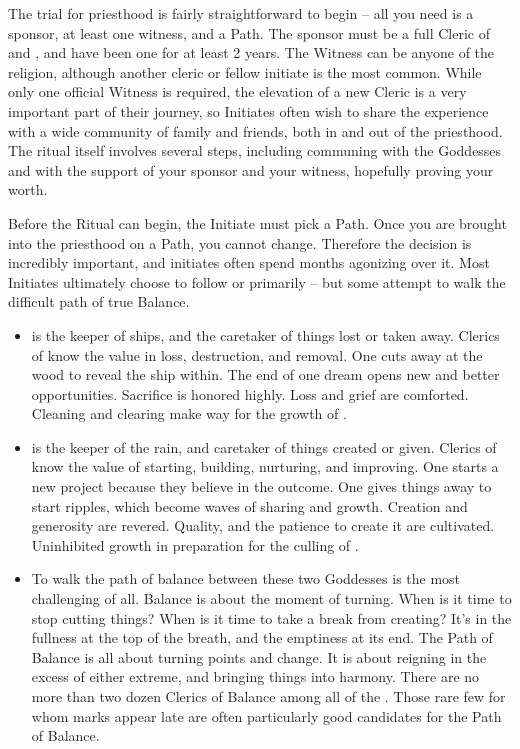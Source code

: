 \documentclass[blue]{GL2020}
\begin{document}
The trial for priesthood is fairly straightforward to begin -- all you need is a sponsor, at least one witness, and a Path. The sponsor must be a full Cleric of \cEbb{} and \cFlow{}, and have been one for at least 2 years. The Witness can be anyone of the \pShippie{} religion, although another cleric or fellow initiate is the most common. While only one official Witness is required, the elevation of a new Cleric is a very important part of their journey, so Initiates often wish to share the experience with a wide community of family and friends, both in and out of the priesthood. The ritual itself involves several steps, including communing with the Goddesses and with the support of your sponsor and your witness, hopefully proving your worth.

Before the Ritual can begin, the Initiate must pick a Path. Once you are brought into the priesthood on a Path, you cannot change. Therefore the decision is incredibly important, and initiates often spend months agonizing over it. Most Initiates ultimately choose to follow \cEbb{} or \cFlow{} primarily -- but some attempt to walk the difficult path of true Balance. 
\begin{itemize}
\item \cEbb{\full} is the keeper of ships, and the caretaker of things lost or taken away. Clerics of \cEbb{} know the value in loss, destruction, and removal. One cuts away at the wood to reveal the ship within. The end of one dream opens new and better opportunities. Sacrifice is honored highly. Loss and grief are comforted. Cleaning and clearing make way for the growth of \cFlow{}. 
\item \cFlow{\full} is the keeper of the rain, and caretaker of things created or given. Clerics of \cFlow{} know the value of starting, building, nurturing, and improving. One starts a new project because they believe in the outcome. One gives things away to start ripples, which become waves of sharing and growth. Creation and generosity are revered. Quality, and the patience to create it are cultivated. Uninhibited growth in preparation for the culling of \cEbb{}.
\item To walk the path of balance between these two Goddesses is the most challenging of all. Balance is about the moment of turning. When is it time to stop cutting things? When is it time to take a break from creating? It's in the fullness at the top of the breath, and the emptiness at its end. The Path of Balance is all about turning points and change. It is about reigning in the excess of either extreme, and bringing things into harmony. There are no more than two dozen Clerics of Balance among all of the \pShippies{}. Those rare few for whom marks appear late are often particularly good candidates for the Path of Balance.
\end{itemize}
\end{document}
